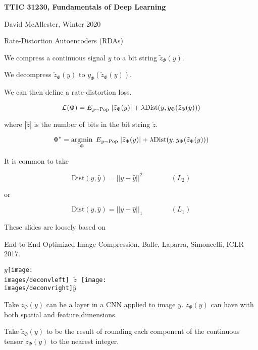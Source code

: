 





{\Huge

  \centerline{\bf TTIC 31230, Fundamentals of Deep Learning}
  \bigskip
  \centerline{David McAllester, Winter 2020}
  \vfill
  \centerline{Rate-Distortion Autoencoders (RDAs)}
  \vfill
  \vfill


We compress a continuous signal $y$ to a bit string $\tilde{z}_\Phi(y)$.

\vfill
We decompress $\tilde{z}_\Phi(y)$ to $y_\Phi(\tilde{z}_\Phi(y))$.

\vfill
We can then define a rate-distortion loss.

{\color{red} $${\cal L}(\Phi) = E_{y \sim \mathrm{Pop}}\;|\tilde{z}_\Phi(y)| + \lambda \mathrm{Dist}(y,y_\Phi(\tilde{z}_\Phi(y)))$$}

\vfill
where $|\tilde{z}|$ is the number of bits in the bit string $\tilde{z}$.


$$\Phi^* = \operatorname*{argmin}_\Phi\;E_{y \sim \mathrm{Pop}}\;|\tilde{z}_\Phi(y)| + \lambda \mathrm{Dist}(y,y_\Phi(\tilde{z}_\Phi(y)))$$

\vfill
It is common to take

$$\mathrm{Dist}(y,\hat{y}) = ||y-\hat{y}||^2 \hspace{4em}(L_2)$$

\vfill
or

$$\mathrm{Dist}(y,\hat{y}) = ||y-\hat{y}||_1 \hspace{4em} (L_1)$$


These slides are loosely based on

\vfill
End-to-End Optimized Image Compression, Balle, Laparra, Simoncelli, ICLR 2017.


\vfill
\centerline{$y$\texttt{[image: \\images/deconvleft]} $\;\tilde{z}\;$ \texttt{[image: \\images/deconvright]}$\hat{y}$}



Take $z_\Phi(y)$ can be a layer in a CNN applied to image $y$.  $z_\Phi(y)$ can have with both spatial and feature dimensions.

\vfill
Take $\tilde{z}_\Phi(y)$ to be the result of rounding each component of the continuous tensor $z_\Phi(y)$ to the nearest integer.

}
